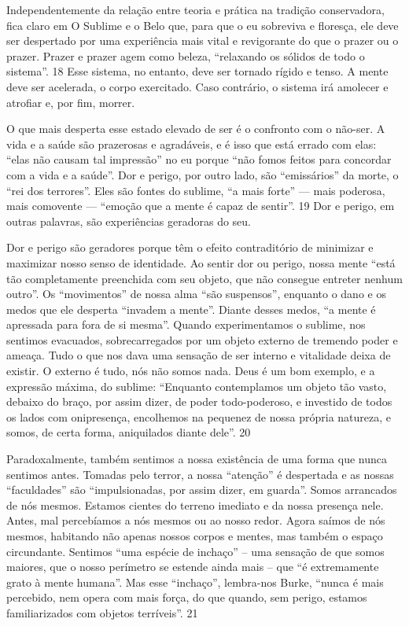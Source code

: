  
\par
 
Independentemente da relação entre teoria e prática na tradição conservadora, fica claro em O Sublime e o Belo que, para que o eu sobreviva e floresça, ele deve ser despertado por uma experiência mais vital e revigorante do que o prazer ou o prazer. Prazer e prazer agem como beleza, “relaxando os sólidos de todo o sistema”.
 {\color{blue} 18}  
Esse sistema, no entanto, deve ser tornado rígido e tenso. A mente deve ser acelerada, o corpo exercitado. Caso contrário, o sistema irá amolecer e atrofiar e, por fim, morrer.
 
\par
 
O que mais desperta esse estado elevado de ser é o confronto com o não-ser. A vida e a saúde são prazerosas e agradáveis, e é isso que está errado com elas: “elas não causam tal impressão” no eu porque “não fomos feitos para concordar com a vida e a saúde”. Dor e perigo, por outro lado, são “emissários” da morte, o “rei dos terrores”. Eles são fontes do sublime, “a mais forte” — mais poderosa, mais comovente — “emoção que a mente é capaz de sentir”.
 {\color{blue} 19}  
Dor e perigo, em outras palavras, são experiências geradoras do seu.
 
\par
 
Dor e perigo são geradores porque têm o efeito contraditório de minimizar e maximizar nosso senso de identidade. Ao sentir dor ou perigo, nossa mente “está tão completamente preenchida com seu objeto, que não consegue entreter nenhum outro”. Os “movimentos” de nossa alma “são suspensos”, enquanto o dano e os medos que ele desperta “invadem a mente”. Diante desses medos, “a mente é apressada para fora de si mesma”. Quando experimentamos o sublime, nos sentimos evacuados, sobrecarregados por um objeto externo de tremendo poder e ameaça. Tudo o que nos dava uma sensação de ser interno e vitalidade deixa de existir. O externo é tudo, nós não somos nada. Deus é um bom exemplo, e a expressão máxima, do sublime: “Enquanto contemplamos um objeto tão vasto, debaixo do braço, por assim dizer, de poder todo-poderoso, e investido de todos os lados com onipresença, encolhemos na pequenez de nossa própria natureza, e somos, de certa forma, aniquilados diante dele”.
 {\color{blue} 20}  

 
\par
 
Paradoxalmente, também sentimos a nossa existência de uma forma que nunca sentimos antes. Tomadas pelo terror, a nossa “atenção” é despertada e as nossas “faculdades” são “impulsionadas, por assim dizer, em guarda”. Somos arrancados de nós mesmos. Estamos cientes do terreno imediato e da nossa presença nele. Antes, mal percebíamos a nós mesmos ou ao nosso redor. Agora saímos de nós mesmos, habitando não apenas nossos corpos e mentes, mas também o espaço circundante. Sentimos “uma espécie de inchaço” – uma sensação de que somos maiores, que o nosso perímetro se estende ainda mais – que “é extremamente grato à mente humana”. Mas esse “inchaço”, lembra-nos Burke, “nunca é mais percebido, nem opera com mais força, do que quando, sem perigo, estamos familiarizados com objetos terríveis”.
 {\color{blue} 21}  

